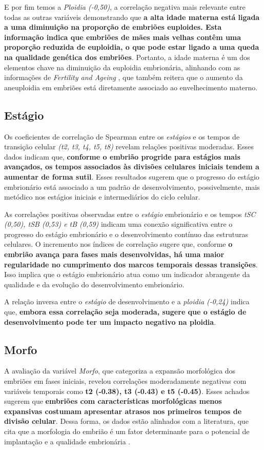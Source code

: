 E por fim temos a \textit{Ploidia (-0,50)}, a correlação negativa mais relevante entre todas as outras variáveis demonstrando que \textbf{a alta idade materna está ligada a uma diminuição na proporção de embriões euploides. Esta informação indica que embriões de mães mais velhas contêm uma proporção reduzida de euploidia, o que pode estar ligado a uma queda na qualidade genética dos embriões}. Portanto, a idade materna é um dos elementos chave na diminuição da euploidia embrionária, alinhando com as informações de \textit{Fertility and Ageing} \cite{eshre2005}, que também reitera que o aumento da aneuploidia em embriões está diretamente associado ao envelhecimento materno.

\subsection*{Estágio}
Os coeficientes de correlação de Spearman entre os \textit{estágios} e os tempos de transição celular \textit{(t2, t3, t4, t5, t8)} revelam relações positivas moderadas. Esses dados indicam que, \textbf{conforme o embrião progride para estágios mais avançados, os tempos associados às divisões celulares iniciais tendem a aumentar de forma sutil}. Esses resultados sugerem que o progresso do estágio embrionário está associado a um padrão de desenvolvimento, possivelmente, mais metódico nos estágios iniciais e intermediários do ciclo celular.

As correlações positivas observadas entre o \textit{estágio} embrionário e os tempos \textit{tSC (0,50), tSB (0,53) e tB (0,59)} indicam uma conexão significativa entre o progresso do estágio embrionário e o desenvolvimento contínuo das estruturas celulares. O incremento nos índices de correlação sugere que, conforme \textbf{o embrião avança para fases mais desenvolvidas, há uma maior regularidade no cumprimento dos marcos temporais dessas transições}. Isso implica que o estágio embrionário atua como um indicador abrangente da qualidade e da evolução do desenvolvimento embrionário.

A relação inversa entre o \textit{estágio} de desenvolvimento e a \textit{ploidia (-0,24)} indica que, \textbf{embora essa correlação seja moderada, sugere que o estágio de desenvolvimento pode ter um impacto negativo na ploidia}. 

\subsection*{Morfo}
A avaliação da variável \textit{Morfo}, que categoriza a expansão morfológica dos embriões em fases iniciais, revelou correlações moderadamente negativas com variáveis temporais como \textbf{t2 (-0.38), t3 (-0.43) e t5 (-0.45)}. Esses achados sugerem que \textbf{embriões com características morfológicas menos expansivas costumam apresentar atrasos nos primeiros tempos de divisão celular}. Dessa forma, os dados estão alinhados com a literatura, que cita que a morfologia do embrião é um fator determinante para o potencial de implantação e a qualidade embrionária .

